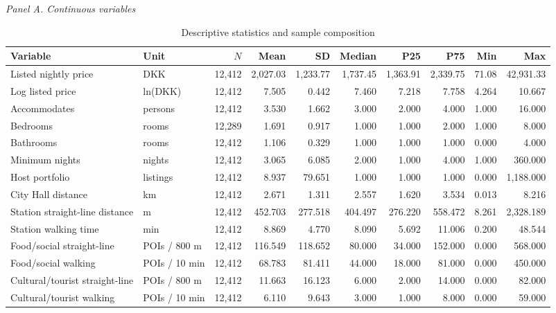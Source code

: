 \begin{landscape}
\begin{table}[p]\centering\footnotesize
\setlength{\tabcolsep}{4pt}\renewcommand{\arraystretch}{0.9}
\begin{threeparttable}
\caption{Descriptive statistics and sample composition}\label{tab:descriptives}
\textit{Panel A. Continuous variables}\par\smallskip
\begin{tabular}{>{\raggedright\arraybackslash}p{5.5cm}>{\raggedright\arraybackslash}p{3.2cm}rrrrrrrr}
\toprule
Variable & Unit & $N$ & Mean & SD & Median & P25 & P75 & Min & Max \\
\midrule
Listed nightly price & DKK & 12,412 & 2,027.03 & 1,233.77 & 1,737.45 & 1,363.91 & 2,339.75 & 71.08 & 42,931.33 \\
Log listed price & ln(DKK) & 12,412 & 7.505 & 0.442 & 7.460 & 7.218 & 7.758 & 4.264 & 10.667 \\
Accommodates & persons & 12,412 & 3.530 & 1.662 & 3.000 & 2.000 & 4.000 & 1.000 & 16.000 \\
Bedrooms & rooms & 12,289 & 1.691 & 0.917 & 1.000 & 1.000 & 2.000 & 1.000 & 8.000 \\
Bathrooms & rooms & 12,412 & 1.106 & 0.329 & 1.000 & 1.000 & 1.000 & 0.000 & 4.000 \\
Minimum nights & nights & 12,412 & 3.065 & 6.085 & 2.000 & 1.000 & 4.000 & 1.000 & 360.000 \\
Host portfolio & listings & 12,412 & 8.937 & 79.651 & 1.000 & 1.000 & 1.000 & 0.000 & 1,188.000 \\
City Hall distance & km & 12,412 & 2.671 & 1.311 & 2.557 & 1.620 & 3.534 & 0.013 & 8.216 \\
Station straight-line distance & m & 12,412 & 452.703 & 277.518 & 404.497 & 276.220 & 558.472 & 8.261 & 2,328.189 \\
Station walking time & min & 12,412 & 8.869 & 4.770 & 8.090 & 5.692 & 11.006 & 0.200 & 48.544 \\
Food/social straight-line & POIs / 800 m & 12,412 & 116.549 & 118.652 & 80.000 & 34.000 & 152.000 & 0.000 & 568.000 \\
Food/social walking & POIs / 10 min & 12,412 & 68.783 & 81.411 & 44.000 & 18.000 & 81.000 & 0.000 & 450.000 \\
Cultural/tourist straight-line & POIs / 800 m & 12,412 & 11.663 & 16.123 & 6.000 & 2.000 & 14.000 & 0.000 & 82.000 \\
Cultural/tourist walking & POIs / 10 min & 12,412 & 6.110 & 9.643 & 3.000 & 1.000 & 8.000 & 0.000 & 59.000 \\

\end{tabular}
\end{threeparttable}
\end{table}
\end{landscape}
